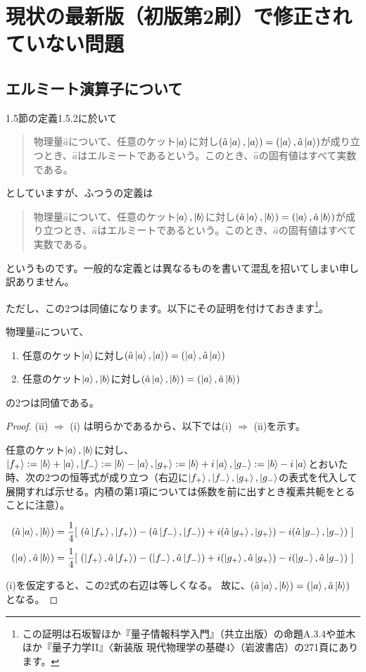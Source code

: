 \documentclass[_main]{subfiles}
\begin{document}
\section{現状の最新版（初版第2刷）で修正されていない問題}
\subsection{エルミート演算子について}
1.5節の定義1.5.2に於いて
\begin{quote}
物理量$\hat{a}$について、任意のケット$\ket{a}$に対し$(\hat{a}\ket{a}, \ket{a}) = (\ket{a},\hat{a}\ket{a})$が成り立つとき、$\hat{a}$はエルミートであるという。このとき、$\hat{a}$の固有値はすべて実数である。
\end{quote}
としていますが、ふつうの定義は
\begin{quote}
物理量$\hat{a}$について、任意のケット$\ket{a},\ket{b}$に対し$(\hat{a}\ket{a}, \ket{b}) = (\ket{a},\hat{a}\ket{b})$が成り立つとき、$\hat{a}$はエルミートであるという。このとき、$\hat{a}$の固有値はすべて実数である。
\end{quote}
というものです。一般的な定義とは異なるものを書いて混乱を招いてしまい申し訳ありません。

ただし、この2つは同値になります。以下にその証明を付けておきます\footnote{この証明は石坂智ほか『量子情報科学入門』（共立出版）の命題A.3.4や並木ほか『量子力学II』〈新装版 現代物理学の基礎4〉（岩波書店）の271頁にあります。}。

\begin{pro.}
	物理量$\hat{a}$について、
	\begin{enumerate}
		\renewcommand{\labelenumi}{(\roman{enumi})}
		\item 任意のケット$\ket{a}$に対し$(\hat{a}\ket{a}, \ket{a}) = (\ket{a},\hat{a}\ket{a})$
		\item 任意のケット$\ket{a},\ket{b}$に対し$(\hat{a}\ket{a}, \ket{b}) = (\ket{a},\hat{a}\ket{b})$
	\end{enumerate}
	の2つは同値である。
\end{pro.}
\begin{proof}
	(ii) $\Rightarrow$ (i) は明らかであるから、以下では(i) $\Rightarrow$ (ii)を示す。
	
	任意のケット$\ket{a},\ket{b}$に対し、$\ket{f_+} := \ket{b} + \ket{a}, \ket{f_-} := \ket{b} - \ket{a}, \ket{g_+} := \ket{b} + i\ket{a}, \ket{g_-} := \ket{b} - i\ket{a}$とおいた時、次の2つの恒等式が成り立つ（右辺に$\ket{f_+},\ket{f_-},\ket{g_+},\ket{g_-}$の表式を代入して展開すれば示せる。内積の第1項については係数を前に出すとき複素共軛をとることに注意）。

	\[
		(\hat{a}\ket{a}, \ket{b}) = \frac{1}{4} [ \  (\hat{a}\ket{f_+}, \ket{f_+}) - (\hat{a}\ket{f_-}, \ket{f_-}) + i(\hat{a}\ket{g_+}, \ket{g_+}) - i(\hat{a}\ket{g_-}, \ket{g_-})\ ]
	\]
	\[
		(\ket{a}, \hat{a}\ket{b}) = \frac{1}{4} [ \  (\ket{f_+}, \hat{a}\ket{f_+}) - (\ket{f_-}, \hat{a}\ket{f_-}) + i(\ket{g_+}, \hat{a}\ket{g_+}) - i(\ket{g_-}, \hat{a}\ket{g_-})\ ]
	\]

	(i)を仮定すると、この2式の右辺は等しくなる。
	故に、$(\hat{a}\ket{a}, \ket{b}) = (\ket{a}, \hat{a}\ket{b})$となる。

\end{proof}
\end{document}
